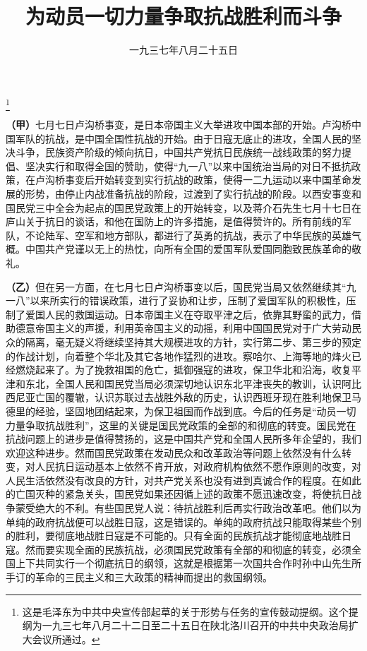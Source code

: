 
\title{为动员一切力量争取抗战胜利而斗争}
\date{一九三七年八月二十五日}
\thanks{这是毛泽东为中共中央宣传部起草的关于形势与任务的宣传鼓动提纲。这个提纲为一九三七年八月二十二日至二十五日在陕北洛川召开的中共中央政治局扩大会议所通过。}
\maketitle


\textbf{（甲）}七月七日卢沟桥事变，是日本帝国主义大举进攻中国本部的开始。卢沟桥中国军队的抗战，是中国全国性抗战的开始。由于日寇无底止的进攻，全国人民的坚决斗争，民族资产阶级的倾向抗日，中国共产党抗日民族统一战线政策的努力提倡、坚决实行和取得全国的赞助，使得“九一八”以来中国统治当局的对日不抵抗政策，在卢沟桥事变后开始转变到实行抗战的政策，使得一二九运动以来中国革命发展的形势，由停止内战准备抗战的阶段，过渡到了实行抗战的阶段。以西安事变和国民党三中全会为起点的国民党政策上的开始转变，以及蒋介石先生七月十七日在庐山关于抗日的谈话，和他在国防上的许多措施，是值得赞许的。所有前线的军队，不论陆军、空军和地方部队，都进行了英勇的抗战，表示了中华民族的英雄气概。中国共产党谨以无上的热忱，向所有全国的爱国军队爱国同胞致民族革命的敬礼。

\textbf{（乙）}但在另一方面，在七月七日卢沟桥事变以后，国民党当局又依然继续其“九一八”以来所实行的错误政策，进行了妥协和让步，压制了爱国军队的积极性，压制了爱国人民的救国运动。日本帝国主义在夺取平津之后，依靠其野蛮的武力，借助德意帝国主义的声援，利用英帝国主义的动摇，利用中国国民党对于广大劳动民众的隔离，毫无疑义将继续坚持其大规模进攻的方针，实行第二步、第三步的预定的作战计划，向着整个华北及其它各地作猛烈的进攻。察哈尔、上海等地的烽火已经燃烧起来了。为了挽救祖国的危亡，抵御强寇的进攻，保卫华北和沿海，收复平津和东北，全国人民和国民党当局必须深切地认识东北平津丧失的教训，认识阿比西尼亚亡国的覆辙，认识苏联过去战胜外敌的历史，认识西班牙现在胜利地保卫马德里的经验，坚固地团结起来，为保卫祖国而作战到底。今后的任务是“动员一切力量争取抗战胜利”，这里的关键是国民党政策的全部的和彻底的转变。国民党在抗战问题上的进步是值得赞扬的，这是中国共产党和全国人民所多年企望的，我们欢迎这种进步。然而国民党政策在发动民众和改革政治等问题上依然没有什么转变，对人民抗日运动基本上依然不肯开放，对政府机构依然不愿作原则的改变，对人民生活依然没有改良的方针，对共产党关系也没有进到真诚合作的程度。在如此的亡国灭种的紧急关头，国民党如果还因循上述的政策不愿迅速改变，将使抗日战争蒙受绝大的不利。有些国民党人说：待抗战胜利后再实行政治改革吧。他们以为单纯的政府抗战便可以战胜日寇，这是错误的。单纯的政府抗战只能取得某些个别的胜利，要彻底地战胜日寇是不可能的。只有全面的民族抗战才能彻底地战胜日寇。然而要实现全面的民族抗战，必须国民党政策有全部的和彻底的转变，必须全国上下共同实行一个彻底抗日的纲领，这就是根据第一次国共合作时孙中山先生所手订的革命的三民主义和三大政策的精神而提出的救国纲领。

